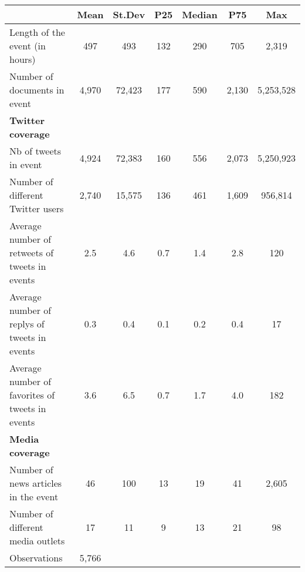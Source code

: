 {
\def\sym#1{\ifmmode^{#1}\else\(^{#1}\)\fi}
\begin{tabular}{l*{1}{cccccc}}
\hline\hline
                    &        Mean&      St.Dev&         P25&      Median&         P75&         Max\\
\hline
Length of the event (in hours)&         497&         493&         132&         290&         705&       2,319\\
Number of documents in event&       4,970&      72,423&         177&         590&       2,130&   5,253,528\\
\textbf{Twitter coverage}&            &            &            &            &            &            \\
Nb of tweets in event&       4,924&      72,383&         160&         556&       2,073&   5,250,923\\
Number of different Twitter users&       2,740&      15,575&         136&         461&       1,609&     956,814\\
Average number of retweets of tweets in events&         2.5&         4.6&         0.7&         1.4&         2.8&         120\\
Average number of replys of tweets in events&         0.3&         0.4&         0.1&         0.2&         0.4&          17\\
Average number of favorites of tweets in events&         3.6&         6.5&         0.7&         1.7&         4.0&         182\\
\textbf{Media coverage}&            &            &            &            &            &            \\
Number of news articles in the event&          46&         100&          13&          19&          41&       2,605\\
Number of different media outlets&          17&          11&           9&          13&          21&          98\\
\hline
Observations        &       5,766&            &            &            &            &            \\
\hline\hline
\end{tabular}
}
